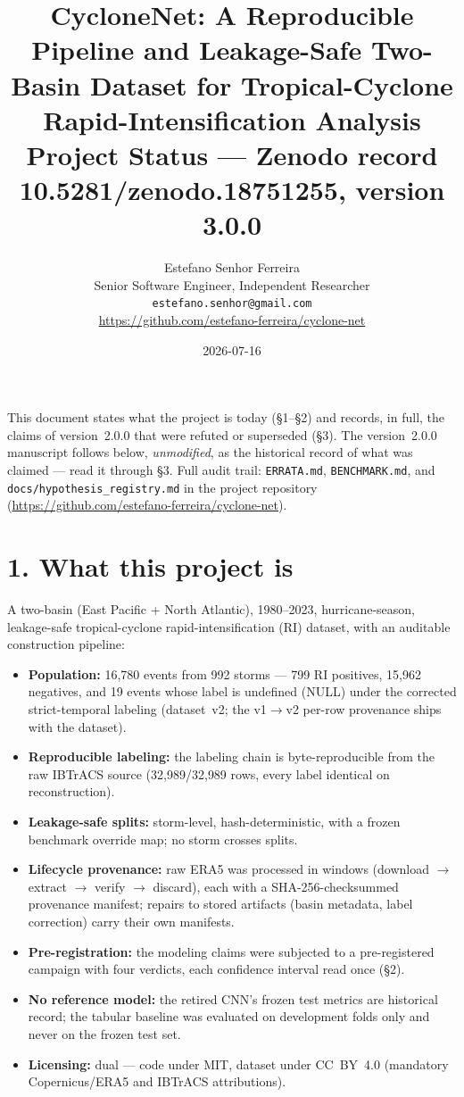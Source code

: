 \documentclass[11pt]{article}
\title{\vspace{-1.2em}CycloneNet: A Reproducible Pipeline and Leakage-Safe
Two-Basin Dataset for Tropical-Cyclone Rapid-Intensification Analysis\\[0.3em]
\large Project Status --- Zenodo record 10.5281/zenodo.18751255, version 3.0.0}
\author{Estefano Senhor Ferreira \\
        Senior Software Engineer, Independent Researcher \\
        \texttt{estefano.senhor@gmail.com} \\
        \url{https://github.com/estefano-ferreira/cyclone-net}
}
\date{2026-07-16}
\begin{document}
\maketitle
\vspace{-1.5em}

\noindent This document states what the project is today (\S1--\S2) and
records, in full, the claims of version~2.0.0 that were refuted or
superseded (\S3). The version~2.0.0 manuscript follows below,
\emph{unmodified}, as the historical record of what was claimed --- read
it through \S3. Full audit trail: \texttt{ERRATA.md},
\texttt{BENCHMARK.md}, and \texttt{docs/hypothesis\_registry.md} in the
project repository
(\url{https://github.com/estefano-ferreira/cyclone-net}).

\section*{1. What this project is}

A two-basin (East Pacific + North Atlantic), 1980--2023, hurricane-season,
leakage-safe tropical-cyclone rapid-intensification (RI) dataset, with an
auditable construction pipeline:

\begin{itemize}
  \item \textbf{Population:} 16{,}780 events from 992 storms --- 799 RI
  positives, 15{,}962 negatives, and 19 events whose label is undefined
  (NULL) under the corrected strict-temporal labeling (dataset~v2; the
  v1$\to$v2 per-row provenance ships with the dataset).
  \item \textbf{Reproducible labeling:} the labeling chain is
  byte-reproducible from the raw IBTrACS source (32{,}989/32{,}989 rows,
  every label identical on reconstruction).
  \item \textbf{Leakage-safe splits:} storm-level, hash-deterministic,
  with a frozen benchmark override map; no storm crosses splits.
  \item \textbf{Lifecycle provenance:} raw ERA5 was processed in windows
  (download $\to$ extract $\to$ verify $\to$ discard), each with a
  SHA-256-checksummed provenance manifest; repairs to stored artifacts
  (basin metadata, label correction) carry their own manifests.
  \item \textbf{Pre-registration:} the modeling claims were subjected to a
  pre-registered campaign with four verdicts, each confidence interval
  read once (\S2).
  \item \textbf{No reference model:} the retired CNN's frozen test
  metrics are historical record; the tabular baseline was evaluated on
  development folds only and never on the frozen test set.
  \item \textbf{Licensing:} dual --- code under MIT, dataset under
  CC~BY~4.0 (mandatory Copernicus/ERA5 and IBTrACS attributions).
\end{itemize}
\end{document}
